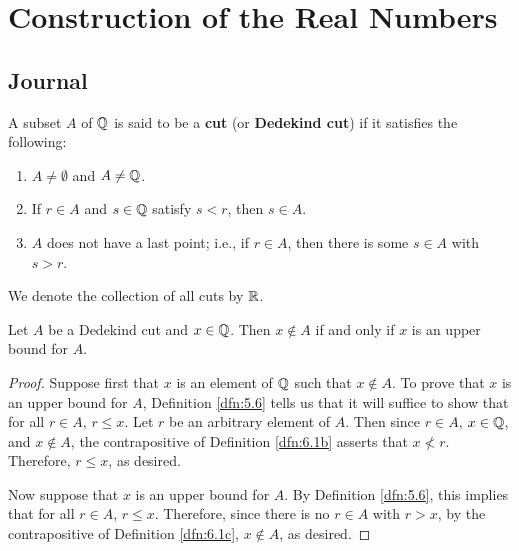 \documentclass[../main.tex]{subfiles}
\begin{document}
\chapter{Construction of the Real Numbers}\label{sct:6}
\section{Journal}
\begin{definition}\label{dfn:6.1}
    A subset $A$ of $\mathbb{Q}$ is said to be a \textbf{cut} (or \textbf{Dedekind cut}) if it satisfies the following:
    \begin{enumerate}[label={(\alph*)},ref={\thedefinition\alph*}]
        \item \label{dfn:6.1a}$A\neq\emptyset$ and $A\neq\mathbb{Q}$.
        \item \label{dfn:6.1b}If $r\in A$ and $s\in\mathbb{Q}$ satisfy $s<r$, then $s\in A$.
        \item \label{dfn:6.1c}$A$ does not have a last point; i.e., if $r\in A$, then there is some $s\in A$ with $s>r$.
    \end{enumerate}
    We denote the collection of all cuts by $\mathbb{R}$.
\end{definition}

\begin{lemma}\label{lem:6.2}
    Let $A$ be a Dedekind cut and $x\in\mathbb{Q}$. Then $x\notin A$ if and only if $x$ is an upper bound for $A$.
    \begin{proof}
        Suppose first that $x$ is an element of $\mathbb{Q}$ such that $x\notin A$. To prove that $x$ is an upper bound for $A$, Definition \ref{dfn:5.6} tells us that it will suffice to show that for all $r\in A$, $r\leq x$. Let $r$ be an arbitrary element of $A$. Then since $r\in A$, $x\in\mathbb{Q}$, and $x\notin A$, the contrapositive of Definition \ref{dfn:6.1b} asserts that $x\not<r$. Therefore, $r\leq x$, as desired.\par
        Now suppose that $x$ is an upper bound for $A$. By Definition \ref{dfn:5.6}, this implies that for all $r\in A$, $r\leq x$. Therefore, since there is no $r\in A$ with $r>x$, by the contrapositive of Definition \ref{dfn:6.1c}, $x\notin A$, as desired.
    \end{proof}
\end{lemma}
\end{document}
